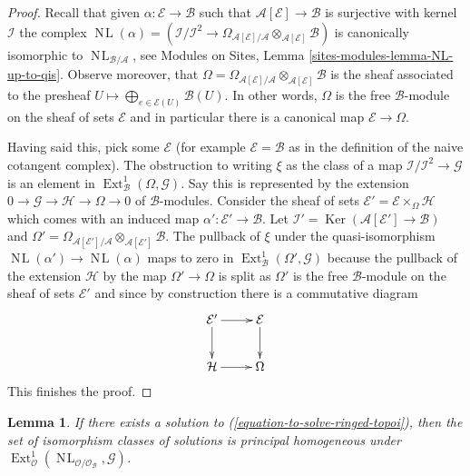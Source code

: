 \documentclass{stacks-project}
\theoremstyle{plain}
\newtheorem{lemma}[subsection]{Lemma}
\theoremstyle{definition}
\theoremstyle{remark}
\numberwithin{equation}{subsection}
\def\Ext{\mathop{\mathrm{Ext}}\nolimits}
\def\NL{\mathop{N\!L}\nolimits}
\def\Ker{\mathop{\mathrm{Ker}}}
\begin{document}
\begin{proof}
Recall that given $\alpha : \mathcal{E} \to \mathcal{B}$
such that $\mathcal{A}[\mathcal{E}] \to \mathcal{B}$ is surjective
with kernel $\mathcal{I}$ the complex
$\NL(\alpha) = (\mathcal{I}/\mathcal{I}^2 \to 
\Omega_{\mathcal{A}[\mathcal{E}]/\mathcal{A}}
\otimes_{\mathcal{A}[\mathcal{E}]} \mathcal{B})$ is canonically
isomorphic to $\NL_{\mathcal{B}/\mathcal{A}}$, see
Modules on Sites, Lemma \ref{sites-modules-lemma-NL-up-to-qis}.
Observe moreover, that
$\Omega = \Omega_{\mathcal{A}[\mathcal{E}]/\mathcal{A}}
\otimes_{\mathcal{A}[\mathcal{E}]} \mathcal{B}$ is the sheaf
associated to the presheaf
$U \mapsto \bigoplus_{e \in \mathcal{E}(U)} \mathcal{B}(U)$.
In other words, $\Omega$ is the free $\mathcal{B}$-module on the
sheaf of sets $\mathcal{E}$ and in particular there is a canonical
map $\mathcal{E} \to \Omega$.

\medskip\noindent
Having said this, pick some $\mathcal{E}$ (for example
$\mathcal{E} = \mathcal{B}$ as in the definition of the naive cotangent
complex). The obstruction to writing $\xi$ as the class of a map
$\mathcal{I}/\mathcal{I}^2 \to \mathcal{G}$ is an element in
$\Ext^1_\mathcal{B}(\Omega, \mathcal{G})$. Say this is represented
by the extension $0 \to \mathcal{G} \to \mathcal{H} \to \Omega \to 0$
of $\mathcal{B}$-modules. Consider the sheaf of sets
$\mathcal{E}' = \mathcal{E} \times_\Omega \mathcal{H}$
which comes with an induced map $\alpha' : \mathcal{E}' \to \mathcal{B}$.
Let $\mathcal{I}' = \Ker(\mathcal{A}[\mathcal{E}'] \to \mathcal{B})$
and $\Omega' = \Omega_{\mathcal{A}[\mathcal{E}']/\mathcal{A}}
\otimes_{\mathcal{A}[\mathcal{E}']} \mathcal{B}$.
The pullback of $\xi$ under the quasi-isomorphism
$\NL(\alpha') \to \NL(\alpha)$ maps to zero in
$\Ext^1_\mathcal{B}(\Omega', \mathcal{G})$
because the pullback of the extension $\mathcal{H}$
by the map $\Omega' \to \Omega$ is split as $\Omega'$ is the free
$\mathcal{B}$-module on the sheaf of sets $\mathcal{E}'$ and since
by construction there is a commutative diagram
$$
\xymatrix{
\mathcal{E}' \ar[r] \ar[d] & \mathcal{E} \ar[d] \\
\mathcal{H} \ar[r] & \Omega
}
$$
This finishes the proof.
\end{proof}

\begin{lemma}
\label{lemma-choices-ringed-topoi}
If there exists a solution to (\ref{equation-to-solve-ringed-topoi}),
then the set of isomorphism classes of solutions is principal homogeneous
under $\Ext^1_\mathcal{O}(
\NL_{\mathcal{O}/\mathcal{O}_\mathcal{B}}, \mathcal{G})$.
\end{lemma}
\end{document}
